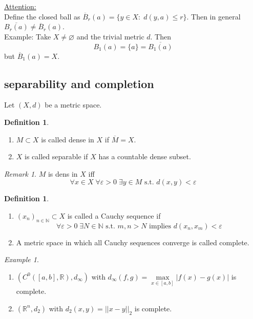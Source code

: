 \documentclass[a4paper, 12pt]{article}
\theoremstyle{plain}
\theoremstyle{definition}
\newtheorem{definition}[theorem]{Definition} %
\theoremstyle{lemma}
\theoremstyle{remark}
\newtheorem{remark}[theorem]{Remark}
\theoremstyle{corollary}
\theoremstyle{example}
\newtheorem{example}[theorem]{Example}
\begin{document}
	\noindent\underline{Attention:}\\
	Define the closed ball as $\overline{B}_r(a) = \{y \in X: \; d(y,a) \leq r\}$. Then in general $\overline{B_r(a)} \neq \overline{B}_r(a)$.\\
	Example: Take $X \neq \varnothing$ and the trivial metric $d$. Then \[B_1(a) = \{a\} = \overline{B_1(a)}\] but $\overline{B}_1(a) = X$.
	
	\subsection{separability and completion}
	Let $(X,d)$ be a metric space.
	\begin{definition}
		\begin{enumerate}
			\item $M \subset X$ is called dense in $X$ if $\overline{M} = X$.
			\item $X$ is called separable if $X$ has a countable dense subset.
		\end{enumerate}
	\end{definition}

	\begin{remark}
		$M$ is dens in $X$ iff \[\forall x \in X \; \forall \varepsilon > 0 \; \exists y \in M \text{ s.t. } d(x,y) < \varepsilon\]
	\end{remark}

	\begin{definition}
		\begin{enumerate}
			\item $(x_n)_{n \in \mathbb{N}} \subset X$ is called a Cauchy sequence if \[\forall \varepsilon > 0 \; \exists N \in \mathbb{N} \text{ s.t. } m,n > N \text{ implies } d(x_n,x_m) < \varepsilon\]
			\item A metric space in which all Cauchy sequences converge is called complete.
		\end{enumerate}
	\end{definition}

	\begin{example}
		\begin{enumerate}
			\item $(C^0([a,b], \mathbb{R}), d_\infty)$ with $d_\infty(f,g) = \max\limits_{x \in [a,b]} \left|f(x)-g(x)\right|$ is complete.
			\item $(\mathbb{R}^n, d_2)$ with $d_2(x,y) = ||x-y||_2$ is complete.
		\end{enumerate}
	\end{example}
\end{document}
